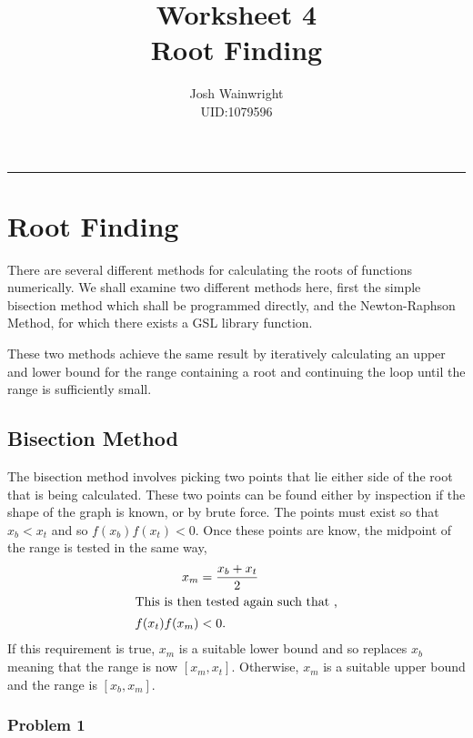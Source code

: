 \documentclass[11pt]{article} %
\author{Josh Wainwright \\ UID:1079596}
\title{Worksheet 4 \\ Root Finding}
\date{}
\begin{document}
\maketitle
\tableofcontents
\vspace{1cm}\hrule \vspace{1cm}
\setcounter{section}{3}
	\section{Root Finding}

	There are several different methods for calculating the roots of functions numerically. We shall examine two different methods here, first the simple bisection method which shall be programmed directly, and the Newton-Raphson Method, for which there exists a GSL library function.

	These two methods achieve the same result by iteratively calculating an upper and lower bound for the range containing a root and continuing the loop until the range is sufficiently small.

	\subsection{Bisection Method}
	The bisection method involves picking two points that lie either side of the root that is being calculated. These two points can be found either by inspection if the shape of the graph is known, or by brute force. The points must exist so that $x_b < x_t$ and so $f(x_b)f(x_t)<0$. Once these points are know, the midpoint of the range is tested in the same way,
	\begin{align*}
		x_m &= \frac{x_b + x_t}{2} \\
		\intertext{This is then tested again such that ,}
		f(x_t)f(x_m) &< 0.
	\end{align*}
	If this requirement is true, $x_m$ is a suitable lower bound and so replaces $x_b$ meaning that the range is now $[x_m,x_t]$. Otherwise, $x_m$ is a suitable upper bound and the range is $[x_b,x_m]$.

	\subsubsection{Problem 1}
\end{document}
